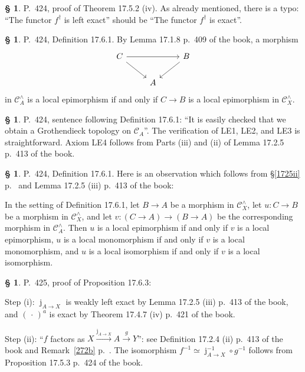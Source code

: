 \documentclass[12pt]{article}
\theoremstyle{remark}
\theoremstyle{definition}
\newtheorem{s}[thm]{\S}
\newcommand{\oo}{\operatorname}
\newcommand{\C}{\mathcal C}
\newcommand{\xr}{\xrightarrow}
\begin{document}
%

\begin{s} 
P.~424, proof of Theorem 17.5.2 (iv). As already mentioned, there is a typo: ``The functor $f^\dagger$ is left exact'' should be ``The functor $f^\dagger$ is exact''. 
\end{s}

%

\begin{s}\label{1761}
P.~424, Definition 17.6.1. By Lemma 17.1.8 p.~409 of the book, a morphism 
$$
\begin{tikzcd} 
C\ar{rr}\ar{dr}&&B\ar{dl}\\ 
{}&A
\end{tikzcd}
$$ 
in $\C_A^\wedge$ is a local epimorphism if and only if $C\to B$ is a local epimorphism in $\C_X^\wedge$.
\end{s}

%

\begin{s}
P.~424, sentence following Definition 17.6.1: ``It is easily checked that we obtain a Grothendieck topology on $\C_A$''. The verification  of LE1, LE2, and LE3 is straightforward. Axiom LE4 follows from Parts (iii) and (ii) of Lemma 17.2.5 p.~413 of the book.
\end{s} 

%

\begin{s}\label{1761b} 
P.~424, Definition 17.6.1. Here is an observation which follows from \S\ref{1725ii} p.~\pageref{1725ii} and Lemma 17.2.5 (iii) p.~413 of the book: 

In the setting of Definition 17.6.1, let $B\to A$ be a morphism in $\C_X^\wedge$, let $u:C\to B$ be a morphism in $\C_X^\wedge$, and let $v:(C\to A)\to(B\to A)$ be the corresponding morphism in $\C_A^\wedge$. Then $u$ is a local epimorphism if and only if $v$ is a local epimorphism, $u$ is a local monomorphism if and only if $v$ is a local monomorphism, and $u$ is a local isomorphism if and only if $v$ is a local isomorphism. 
\end{s} 

%

\begin{s}
P.~425, proof of Proposition 17.6.3: 

Step (i): $\oo j_{A\to X}$ is weakly left exact by Lemma 17.2.5 (iii) p.~413 of the book, and $(\,\cdot\,)^a$ is exact by Theorem 17.4.7 (iv) p.~421 of the book.

Step (ii): ``$f$ factors as $X\xr{\oo j_{A\to X}}A\xr gY$'': see Definition 17.2.4 (ii) p.~413 of the book and Remark~\ref{272b} p.~\pageref{272b}. The isomorphism $f^{-1}\simeq\oo j_{A\to X}^{-1}\circ g^{-1}$ follows from Proposition 17.5.3 p.~424 of the book.
\end{s} 
\end{document}
